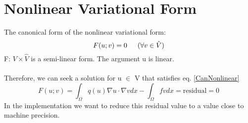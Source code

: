 \documentclass[12pt,3p]{article}
\begin{document}
\section{Nonlinear Variational Form}
The canonical form of the nonlinear variational form:
\begin{equation}\label{CanNonlinear}
F(u;v) = 0 \indent (\forall v \in \hat V)
\end{equation}
F: $V \times \hat V$ is a semi-linear form. The argument u is linear. \\ \\
Therefore, we can seek a solution for u $\in$ V that satisfies eq. \ref{CanNonlinear}
\begin{equation}
F(u;v) = \int_{\Omega} q(u) \nabla u \cdot \nabla vdx - \int_{\Omega} f v dx = \text{residual} = 0 
\end{equation}
In the implementation we want to reduce this residual value to a value close to machine precision. 
\end{document}
